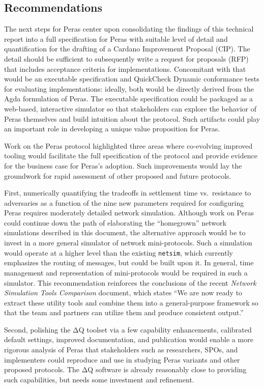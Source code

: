 \documentclass[10pt]{article}
\begin{document}
\subsection{Recommendations}\label{recommendations}

The next steps for Peras center upon consolidating the findings of this
technical report into a full specification for Peras with suitable level
of detail and quantification for the drafting of a Cardano Improvement
Proposal (CIP). The detail should be sufficient to subsequently write a
request for proposals (RFP) that includes acceptance criteria for
implementations. Concomitant with that would be an executable
specification and QuickCheck Dynamic conformance tests for evaluating
implementations: ideally, both would be directly derived from the Agda
formulation of Peras. The executable specification could be packaged as
a web-based, interactive simulator so that stakeholders can explore the
behavior of Peras themselves and build intuition about the protocol.
Such artifacts could play an important role in developing a unique value
proposition for Peras.

Work on the Peras protocol highlighted three areas where co-evolving
improved tooling would facilitate the full specification of the protocol
and provide evidence for the business case for Peras's adoption. Such
improvements would lay the groundwork for rapid assessment of other
proposed and future protocols.

First, numerically quantifying the tradeoffs in settlement time
vs.~resistance to adversaries as a function of the nine new parameters
required for configuring Peras requires moderately detailed network
simulation. Although work on Peras could continue down the path of
elaborating the ``homegrown'' network simulations described in this
document, the alternative approach would be to invest in a more general
simulator of network mini-protocols. Such a simulation would operate at
a higher level than the existing \texttt{netsim}, which currently
emphasizes the routing of messages, but could be built upon it. In
general, time management and representation of mini-protocols would be
required in such a simulator. This recommendation reinforces the
conclusions of the recent \emph{Network Simulation Tools Comparison}
document, which states ``We are now ready to extract these utility tools
and combine them into a general-purpose framework so that the team and
partners can utilize them and produce consistent output.''

Second, polishing the ΔQ toolset via a few capability enhancements,
calibrated default settings, improved documentation, and publication
would enable a more rigorous analysis of Peras that stakeholders such as
researchers, SPOs, and implementers could reproduce and use in studying
Peras variants and other proposed protocols. The ΔQ software is already
reasonably close to providing such capabilities, but needs some
investment and refinement.
\end{document}
